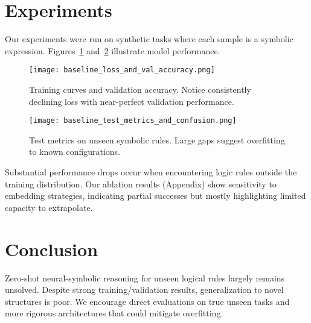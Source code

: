 \documentclass[11pt]{article}
\begin{document}
\section{Experiments}
Our experiments were run on synthetic tasks where each sample is a symbolic expression. Figures~\ref{fig:baseline_training} and~\ref{fig:baseline_test} illustrate model performance.

\begin{figure}[ht]
  \centering
  \texttt{[image: baseline\_loss\_and\_val\_accuracy.png]}
  \caption{Training curves and validation accuracy. Notice consistently declining loss with near-perfect validation performance.}
  \label{fig:baseline_training}
\end{figure}

\begin{figure}[ht]
  \centering
  \texttt{[image: baseline\_test\_metrics\_and\_confusion.png]}
  \caption{Test metrics on unseen symbolic rules. Large gaps suggest overfitting to known configurations.}
  \label{fig:baseline_test}
\end{figure}

Substantial performance drops occur when encountering logic rules outside the training distribution. Our ablation results (Appendix) show sensitivity to embedding strategies, indicating partial successes but mostly highlighting limited capacity to extrapolate.

\section{Conclusion}
Zero-shot neural-symbolic reasoning for unseen logical rules largely remains unsolved. Despite strong training/validation results, generalization to novel structures is poor. We encourage direct evaluations on true unseen tasks and more rigorous architectures that could mitigate overfitting.

\clearpage
\appendix
\end{document}
